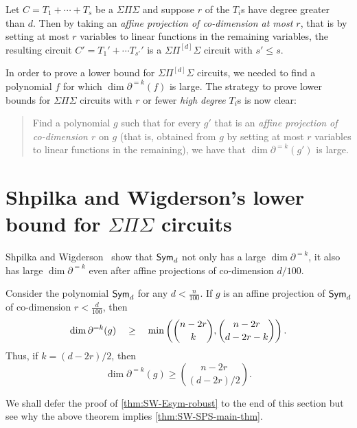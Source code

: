 \begin{lemma}\label{lem:d3-few-affine-projection}
  Let $C = T_1 + \cdots + T_s$ be a $\Sigma\Pi\Sigma$ and suppose $r$ of the $T_i$s have degree greater than $d$.
Then by taking an \emph{affine projection of co-dimension at most $r$}, that is by setting at most $r$ variables to linear functions in the remaining variables, the resulting circuit $C' = T_1' + \cdots T_{s'}'$ is a $\Sigma\Pi^{[d]}\Sigma$ circuit with $s' \leq s$.
\end{lemma}

In order to prove a lower bound for $\Sigma\Pi^{[d]}\Sigma$ circuits, we needed to find a polynomial $f$ for which $\dim \partial^{=k}(f)$ is large.
The strategy to prove lower bounds for $\Sigma\Pi\Sigma$ circuits with $r$ or fewer \emph{high degree} $T_i$s is now clear:
\begin{quote}
  Find a polynomial $g$ such that for every $g'$ that is an \emph{affine projection of co-dimension $r$} on $g$ (that is, obtained from $g$ by setting at most $r$ variables to linear functions in the remaining), we have that $\dim \partial^{=k}(g')$ is large.  
\end{quote}

\section{Shpilka and Wigderson's lower bound for $\Sigma\Pi\Sigma$ circuits}

Shpilka and Wigderson~\cite{sw2001} show that $\operatorname{\mathsf{Sym}}_d$ not only has a large $\dim \partial^{=k}$, it also has large $\dim \partial^{=k}$ even after affine projections of co-dimension $d/100$. 

\begin{theorem}[\cite{sw2001}]\label{thm:SW-Esym-robust} Consider the polynomial $\operatorname{\mathsf{Sym}}_d$ for any $d < \frac{n}{100}$. If $g$ is an affine projection of $\operatorname{\mathsf{Sym}}_d$ of co-dimension $r < \frac{d}{100}$, then
\[
\dim \partial^{=k}(g) \quad \geq \quad \min\left(\binom{n-2r}{k},\binom{n-2r}{d-2r -k}\right).
\]
Thus, if $k = (d-2r)/2$, then 
\[
\dim \partial^{=k}(g) \geq \binom{n-2r}{(d-2r)/2}.
\]
\end{theorem}

We shall defer the proof of \autoref{thm:SW-Esym-robust} to the end of this section but see why the above theorem implies \autoref{thm:SW-SPS-main-thm}. 

